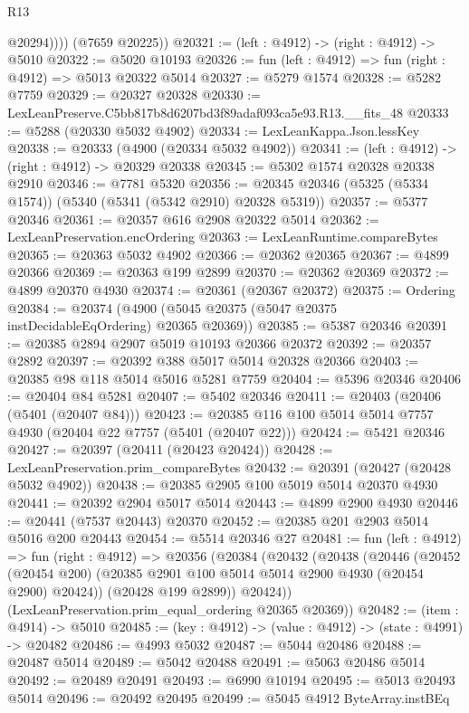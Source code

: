\begin{lexlean}{R13}
\begin{coremodule}
              @20294))))
      (@7659 @20225))
@20321 := (left : @4912) -> (right : @4912) -> @5010
@20322 := @5020 @10193
@20326 := fun (left : @4912) => fun (right : @4912) => @5013 @20322 @5014
@20327 := @5279 @1574
@20328 := @5282 @7759
@20329 := @20327 @20328
@20330 := LexLeanPreserve.C5bb817b8d6207bd3f89adaf093ca5e93.R13.__fits_48
@20333 := @5288 (@20330 @5032 @4902)
@20334 := LexLeanKappa.Json.lessKey
@20338 := @20333 (@4900 (@20334 @5032 @4902))
@20341 := (left : @4912) -> (right : @4912) -> @20329 @20338
@20345 := @5302 @1574 @20328 @20338 @2910
@20346 := @7781 @5320
@20356 := @20345 @20346 (@5325 (@5334 @1574)) (@5340 (@5341 (@5342 @2910) @20328 @5319))
@20357 := @5377 @20346
@20361 := @20357 @616 @2908 @20322 @5014
@20362 := LexLeanPreservation.encOrdering
@20363 := LexLeanRuntime.compareBytes
@20365 := @20363 @5032 @4902
@20366 := @20362 @20365
@20367 := @4899 @20366
@20369 := @20363 @199 @2899
@20370 := @20362 @20369
@20372 := @4899 @20370 @4930
@20374 := @20361 (@20367 @20372)
@20375 := Ordering
@20384 := @20374 (@4900 (@5045 @20375 (@5047 @20375 instDecidableEqOrdering) @20365 @20369))
@20385 := @5387 @20346
@20391 := @20385 @2894 @2907 @5019 @10193 @20366 @20372
@20392 := @20357 @2892
@20397 := @20392 @388 @5017 @5014 @20328 @20366
@20403 := @20385 @98 @118 @5014 @5016 @5281 @7759
@20404 := @5396 @20346
@20406 := @20404 @84 @5281
@20407 := @5402 @20346
@20411 := @20403 (@20406 (@5401 (@20407 @84)))
@20423 := @20385 @116 @100 @5014 @5014 @7757 @4930 (@20404 @22 @7757 (@5401 (@20407 @22)))
@20424 := @5421 @20346
@20427 := @20397 (@20411 (@20423 @20424))
@20428 := LexLeanPreservation.prim_compareBytes
@20432 := @20391 (@20427 (@20428 @5032 @4902))
@20438 := @20385 @2905 @100 @5019 @5014 @20370 @4930
@20441 := @20392 @2904 @5017 @5014
@20443 := @4899 @2900 @4930
@20446 := @20441 (@7537 @20443) @20370
@20452 := @20385 @201 @2903 @5014 @5016 @200 @20443
@20454 := @5514 @20346 @27
@20481 := fun (left : @4912) =>
  fun (right : @4912) =>
  @20356
    (@20384
      (@20432
        (@20438
          (@20446
            (@20452 (@20454 @200) (@20385 @2901 @100 @5014 @5014 @2900 @4930 (@20454 @2900) @20424))
            (@20428 @199 @2899))
          @20424))
      (LexLeanPreservation.prim_equal_ordering @20365 @20369))
@20482 := (item : @4914) -> @5010
@20485 := (key : @4912) -> (value : @4912) -> (state : @4991) -> @20482
@20486 := @4993 @5032
@20487 := @5044 @20486
@20488 := @20487 @5014
@20489 := @5042 @20488
@20491 := @5063 @20486 @5014
@20492 := @20489 @20491
@20493 := @6990 @10194
@20495 := @5013 @20493 @5014
@20496 := @20492 @20495
@20499 := @5045 @4912 ByteArray.instBEq

\end{coremodule}
\end{lexlean}
